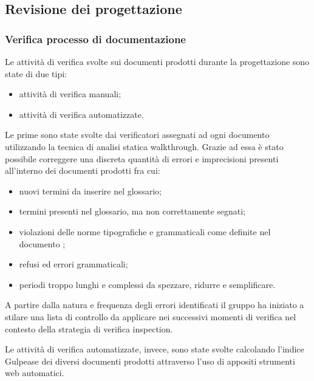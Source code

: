 \subsection{Revisione dei progettazione}
		\subsubsection{Verifica processo di documentazione}
		Le attività di verifica svolte sui documenti prodotti durante la progettazione sono state di due tipi:
		\begin{itemize}		
			\item attività di verifica manuali;
			\item attività di verifica automatizzate.
		\end{itemize}
		
		Le prime sono state svolte dai verificatori assegnati ad ogni documento utilizzando la tecnica di 					analisi statica walkthrough. Grazie ad essa è stato possibile correggere una discreta quantità di errori e imprecisioni presenti all'interno dei documenti prodotti fra cui: 
		\begin{itemize}	
			\item nuovi termini da inserire nel glossario;
			\item termini presenti nel glossario, ma non correttamente segnati;
			\item violazioni delle norme tipografiche e grammaticali come definite nel documento \NdP ;
			\item refusi ed errori grammaticali;
			\item periodi troppo lunghi e complessi da spezzare, ridurre e semplificare.
		\end{itemize}
		A partire dalla natura e frequenza degli errori identificati il gruppo ha iniziato a stilare una lista
		di controllo da applicare nei successivi momenti di verifica nel contesto della strategia di verifica
		inspection.

		Le attività di verifica automatizzate, invece, sono state svolte calcolando l'indice Gulpease dei 	
		diversi documenti prodotti attraverso l'uso di appositi strumenti web automatici. 
		
